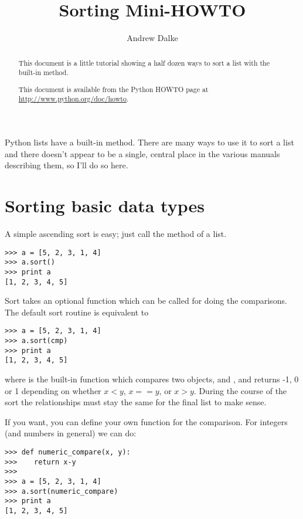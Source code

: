 \documentclass{howto}
\title{Sorting Mini-HOWTO}
\author{Andrew Dalke}
\begin{document}
\maketitle

\begin{abstract}
\noindent
This document is a little tutorial
showing a half dozen ways to sort a list with the built-in
 method.  

This document is available from the Python HOWTO page at
\url{http://www.python.org/doc/howto}.
\end{abstract}

\tableofcontents

Python lists have a built-in  method.  There are many
ways to use it to sort a list and there doesn't appear to be a single,
central place in the various manuals describing them, so I'll do so
here.

\section{Sorting basic data types}

A simple ascending sort is easy; just call the  method of a list.

\begin{verbatim}
>>> a = [5, 2, 3, 1, 4]
>>> a.sort()
>>> print a
[1, 2, 3, 4, 5]
\end{verbatim}

Sort takes an optional function which can be called for doing the
comparisons.  The default sort routine is equivalent to

\begin{verbatim}
>>> a = [5, 2, 3, 1, 4]
>>> a.sort(cmp)
>>> print a
[1, 2, 3, 4, 5]
\end{verbatim}

where  is the built-in function which compares two objects,  and
, and returns -1, 0 or 1 depending on whether $x<y$, $x==y$, or $x>y$.  During
the course of the sort the relationships must stay the same for the
final list to make sense.

If you want, you can define your own function for the comparison.  For 
integers (and numbers in general) we can do:

\begin{verbatim}
>>> def numeric_compare(x, y):
>>>    return x-y
>>> 
>>> a = [5, 2, 3, 1, 4]
>>> a.sort(numeric_compare)
>>> print a
[1, 2, 3, 4, 5]
\end{verbatim}
\end{document}

